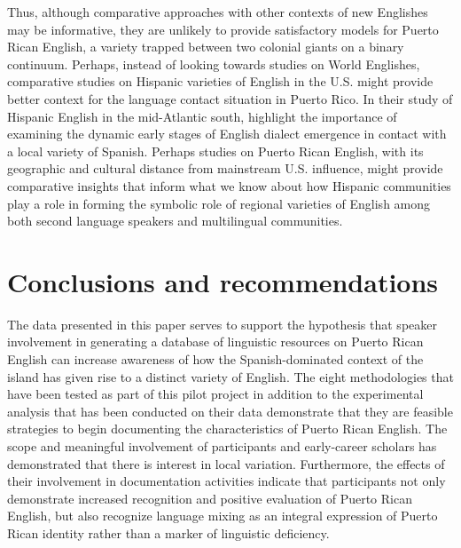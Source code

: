 \documentclass[output=paper,colorlinks,citecolor=brown]{langscibook}
\begin{document}
Thus, although comparative approaches with other contexts of new Englishes may be informative, they are unlikely to provide satisfactory models for Puerto Rican English, a variety trapped between two colonial giants on a binary continuum. Perhaps, instead of looking towards studies on World Englishes, comparative studies on Hispanic varieties of English in the U.S. might provide better context for the language contact situation in Puerto Rico. In their study of Hispanic English in the mid-Atlantic south, \citet{Wolfram_Carter_Moriello_2004} highlight the importance of examining the dynamic early stages of English dialect emergence in contact with a local variety of Spanish. Perhaps studies on Puerto Rican English, with its geographic and cultural distance from mainstream U.S. influence, might provide comparative insights that inform what we know about how Hispanic communities play a role in forming the symbolic role of regional varieties of English among both second language speakers and multilingual communities.


\section{Conclusions and recommendations}

The data presented in this paper serves to support the hypothesis that speaker involvement in generating a database of linguistic resources on Puerto Rican English can increase awareness of how the Spanish-dominated context of the island has given rise to a distinct variety of English. The eight methodologies that have been tested as part of this pilot project in addition to the experimental analysis that has been conducted on their data demonstrate that they are feasible strategies to begin documenting the characteristics of Puerto Rican English. The scope and meaningful involvement of participants and early-career scholars has demonstrated that there is interest in local variation. Furthermore, the effects of their involvement in documentation activities indicate that participants not only demonstrate increased recognition and positive evaluation of Puerto Rican English, but also recognize language mixing as an integral expression of Puerto Rican identity rather than a marker of linguistic deficiency. 
\end{document}
